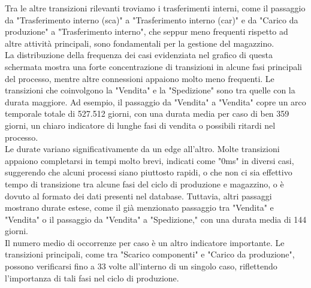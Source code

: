 \documentclass{article}
\begin{document}
Tra le altre transizioni rilevanti troviamo i trasferimenti interni, come il passaggio da "Trasferimento interno (sca)" a "Trasferimento interno (car)" e da "Carico da produzione" a "Trasferimento interno", che seppur meno frequenti rispetto ad altre attività principali, sono fondamentali per la gestione del magazzino.\\
La distribuzione della frequenza dei casi evidenziata nel grafico di questa schermata mostra una forte concentrazione di transizioni in alcune fasi principali del processo, mentre altre connessioni appaiono molto meno frequenti. Le transizioni che coinvolgono la "Vendita" e la "Spedizione" sono tra quelle con la durata maggiore. Ad esempio, il passaggio da "Vendita" a "Vendita" copre un arco temporale totale di 527.512 giorni, con una durata media per caso di ben 359 giorni, un chiaro indicatore di lunghe fasi di vendita o possibili ritardi nel processo.\\
Le durate variano significativamente da un edge all'altro. Molte transizioni appaiono completarsi in tempi molto brevi, indicati come "0ms" in diversi casi, suggerendo che alcuni processi siano piuttosto rapidi, o che non ci sia effettivo tempo di transizione tra alcune fasi del ciclo di produzione e magazzino, o è dovuto al formato dei dati presenti nel database. Tuttavia, altri passaggi mostrano durate estese, come il già menzionato passaggio tra "Vendita" e "Vendita" o il passaggio da "Vendita" a "Spedizione," con una durata media di 144 giorni.\\
Il numero medio di occorrenze per caso è un altro indicatore importante. Le transizioni principali, come tra "Scarico componenti" e "Carico da produzione", possono verificarsi fino a 33 volte all'interno di un singolo caso, riflettendo l'importanza di tali fasi nel ciclo di produzione.\\
\end{document}
